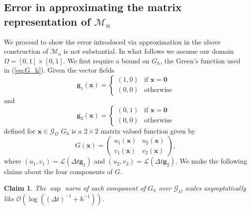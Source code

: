 \documentclass[preprint,12pt]{elsarticle}
\newtheorem{claim}{Claim}[section]
\begin{document}
\subsection{Error in approximating the matrix representation of $\mathcal{M}_n$}
We proceed to show the error introduced via approximation in the above construction of $\mathcal{M}_n$ is not substantial. In what follows we assume our domain $\Omega = [0,1]\times[0,1]$. 
We first require a bound on $G_h$, the Green's function used in (\ref{eq:G_h}). Given the vector fields
\begin{equation}
\mathbf{g}_1(\mathbf{x}) = \begin{cases}
(1,0)& \textrm{if } \mathbf{x} = \mathbf{0} \\
(0,0)& \textrm{otherwise}
\end{cases}
\end{equation}
and
\begin{equation}
\mathbf{g}_2(\mathbf{x}) = \begin{cases}
(0,1)& \textrm{if } \mathbf{x} = \mathbf{0} \\
(0,0)& \textrm{otherwise}
\end{cases}
\end{equation}
defined for $\mathbf{x} \in \mathcal{G}_\Omega$
$G_h$ is a $2\times 2$ matrix valued function given by
\begin{equation}
G(\mathbf{x})=
\left( \begin{array}{cc}
u_1(\mathbf{x}) & u_2(\mathbf{x}) \\
v_1(\mathbf{x}) & v_2(\mathbf{x})
\end{array} \right),
\end{equation}
where $(u_1,v_1) = \mathcal{L}(\Delta t\mathbf{g}_1)$ and $(u_2,v_2) = \mathcal{L}(\Delta t\mathbf{g}_2)$.
We make the following claims about the four components of $G$.
\begin{claim}
The $\sup$ norm of each component of $G_h$ over $\mathcal{G}_\Omega$ scales asymptotically like $\mathcal{O}(\log((\Delta t)^{-1} + h^{-1}))$.
\end{claim}
\end{document}
